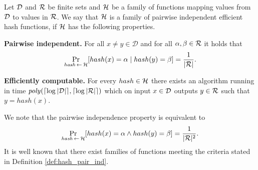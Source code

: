 \begin{definition}
  \label{def:hash_pair_ind}
Let $\mathcal{D}$ and $\mathcal{R}$ be finite sets and $\mathcal{H}$ be a family of functions mapping values from $\mathcal{D}$ to values in $\mathcal{R}$.
We say that $\mathcal{H}$ is a \textnormal{family of pairwise independent efficient hash functions},
if $\mathcal{H}$ has the following properties.

\textbf{Pairwise independent.} For all $x \neq y \in \mathcal{D}$ and for all $\alpha, \beta \in \mathcal{R}$ it holds that
\begin{displaymath}
\underset{\hash \la0 \cH}{\Pr}[hash(x) = \alpha \mid hash(y) = \beta] = \frac{1}{|\cR|}.
\end{displaymath}


\textbf{Efficiently computable.}
For every $hash \in \mathcal{H}$ there exists an algorithm running in time $\operatorname{\mathit{poly}}(\lceil \log|\mathcal{D}| \rceil, \lceil \log|\mathcal{R}| \rceil)$ which
on input $x \in \mathcal{D}$ outputs $y \in \mathcal{R}$ such that $y = hash(x)$.
\end{definition}

We note that the pairwise independence property is equivalent to
\begin{displaymath}
\underset{\hash \la0 \cH}{\Pr}[hash(x) = \alpha \land hash(y) = \beta] = \frac{1}{|\cR|^2}.
\end{displaymath}
It is well known \cite{Carter:1977:UCH:800105.803400} that there exist families of functions meeting the criteria stated in Definition \ref{def:hash_pair_ind}.

